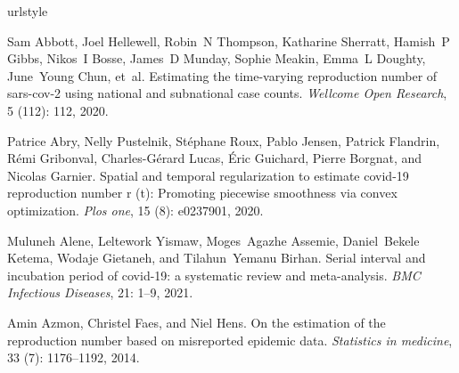 \documentclass[10pt,letterpaper]{article}
\begin{document}
%
%
% 
\begin{thebibliography}{32}
  \providecommand{\natexlab}[1]{#1}
  \providecommand{\url}[1]{\texttt{#1}}
  \expandafter\ifx\csname urlstyle\endcsname\relax
    \providecommand{\doi}[1]{doi: #1}\else
    \providecommand{\doi}{doi: \begingroup \urlstyle{rm}\Url}\fi
  
  Sam Abbott, Joel Hellewell, Robin~N Thompson, Katharine Sherratt, Hamish~P
    Gibbs, Nikos~I Bosse, James~D Munday, Sophie Meakin, Emma~L Doughty,
    June~Young Chun, et~al.
  \newblock Estimating the time-varying reproduction number of sars-cov-2 using
    national and subnational case counts.
  \newblock \emph{Wellcome Open Research}, 5 (112): 112, 2020.
  
  Patrice Abry, Nelly Pustelnik, St{\'e}phane Roux, Pablo Jensen, Patrick
    Flandrin, R{\'e}mi Gribonval, Charles-G{\'e}rard Lucas, {\'E}ric Guichard,
    Pierre Borgnat, and Nicolas Garnier.
  \newblock Spatial and temporal regularization to estimate covid-19 reproduction
    number r (t): Promoting piecewise smoothness via convex optimization.
  \newblock \emph{Plos one}, 15 (8): e0237901, 2020.
  
  Muluneh Alene, Leltework Yismaw, Moges~Agazhe Assemie, Daniel~Bekele Ketema,
    Wodaje Gietaneh, and Tilahun~Yemanu Birhan.
  \newblock Serial interval and incubation period of covid-19: a systematic
    review and meta-analysis.
  \newblock \emph{BMC Infectious Diseases}, 21: 1--9, 2021.
  
  Amin Azmon, Christel Faes, and Niel Hens.
  \newblock On the estimation of the reproduction number based on misreported
    epidemic data.
  \newblock \emph{Statistics in medicine}, 33 (7): 1176--1192,
    2014.
  

\end{thebibliography}
\end{document}
